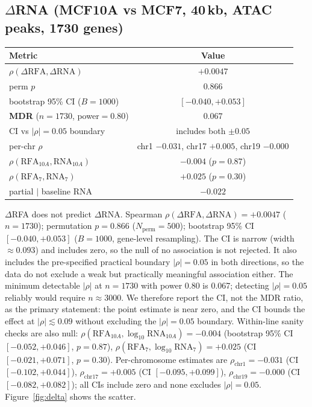 \documentclass[11pt,a4paper]{article}
\begin{document}
\subsection{$\Delta$RNA (MCF10A vs MCF7, 40\,kb, ATAC peaks, 1730 genes)}
\begin{table}[h]
\centering
\begin{tabular}{lc}
\toprule
Metric & Value \\
\midrule
$\rho(\Delta\mathrm{RFA}, \Delta\mathrm{RNA})$ & $\mathbf{+0.0047}$ \\
perm $p$ & 0.866 \\
bootstrap 95\% CI ($B=1000$) & $[-0.040, +0.053]$ \\
\textbf{MDR} ($n=1730$, power$=0.80$) & $0.067$ \\
CI vs $|\rho|=0.05$ boundary & includes both $\pm 0.05$ \\
per-chr $\rho$ & chr1 $-0.031$, chr17 $+0.005$, chr19 $-0.000$ \\
$\rho(\mathrm{RFA}_{10A}, \mathrm{RNA}_{10A})$ & $-0.004$ ($p=0.87$) \\
$\rho(\mathrm{RFA}_{7}, \mathrm{RNA}_{7})$ & $+0.025$ ($p=0.30$) \\
partial $\mid$ baseline RNA & $-0.022$ \\
\bottomrule
\end{tabular}
\end{table}

$\Delta$RFA does not predict $\Delta$RNA. Spearman $\rho(\Delta\mathrm{RFA}, \Delta\mathrm{RNA}) = +0.0047$ ($n=1730$); permutation $p=0.866$ ($N_{\mathrm{perm}}=500$); bootstrap 95\% CI $[-0.040, +0.053]$ ($B=1000$, gene-level resampling). The CI is narrow (width $\approx 0.093$) and includes zero, so the null of no association is not rejected. It also includes the pre-specified practical boundary $|\rho|=0.05$ in both directions, so the data do not exclude a weak but practically meaningful association either. The minimum detectable $|\rho|$ at $n=1730$ with power 0.80 is 0.067; detecting $|\rho|=0.05$ reliably would require $n\approx 3000$. We therefore report the CI, not the MDR ratio, as the primary statement: the point estimate is near zero, and the CI bounds the effect at $|\rho|\lesssim 0.09$ without excluding the $|\rho|=0.05$ boundary. Within-line sanity checks are also null: $\rho(\mathrm{RFA}_{10A}, \log_{10}\mathrm{RNA}_{10A}) = -0.004$ (bootstrap 95\% CI $[-0.052, +0.046]$, $p=0.87$), $\rho(\mathrm{RFA}_{7}, \log_{10}\mathrm{RNA}_{7}) = +0.025$ (CI $[-0.021, +0.071]$, $p=0.30$). Per-chromosome estimates are $\rho_{\mathrm{chr1}}=-0.031$ (CI $[-0.102, +0.044]$), $\rho_{\mathrm{chr17}}=+0.005$ (CI $[-0.095, +0.099]$), $\rho_{\mathrm{chr19}}=-0.000$ (CI $[-0.082, +0.082]$); all CIs include zero and none excludes $|\rho|=0.05$. Figure~\ref{fig:delta} shows the scatter.
\end{document}
